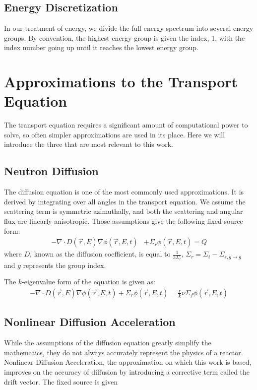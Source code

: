 \subsection{Energy Discretization}
In our treatment of energy, we divide the full energy spectrum into several energy groups. By convention, the highest energy group is given the index, 1, with the index number going up until it reaches the lowest energy group. 

\section{Approximations to the Transport Equation}
The transport equation requires a significant amount of computational power to solve, so often simpler approximations are used in its place. Here we will introduce the three that are most relevant to this work.

\subsection{Neutron Diffusion}
The diffusion equation is one of the most commonly used approximations. It is derived by integrating over all angles in the transport equation. We assume the scattering term is symmetric azimuthally, and both the scattering and angular flux are linearly anisotropic. Those assumptions give the following fixed source form:
\begin{equation}
\begin{split}
 - \nabla \cdot D(\vec{r}, E)\nabla\phi(\vec{r}, E, t) &+ \Sigma_r \phi(\vec{r}, E, t) = Q
\end{split}
\label{eq:diffusion_fixed_source}
\end{equation}
where $D$, known as the diffusion coefficient, is equal to $\frac{1}{3\Sigma_t}$, $\Sigma_r = \Sigma_t - \Sigma_{s, g \rightarrow g}$ and $g$ represents the group index. 

The $k$-eigenvalue form of the equation is given as:
\begin{equation}
    \begin{split}
         - \nabla \cdot D(\vec{r}, E)\nabla\phi(\vec{r}, E, t) + \Sigma_r \phi(\vec{r}, E, t) =  \frac{\chi}{k}\nu\Sigma_f\phi(\vec{r}, E, t) 
    \end{split}
    \label{eq:diffusion_eigenvalue}
\end{equation}

\subsection{Nonlinear Diffusion Acceleration}
While the assumptions of the diffusion equation greatly simplify the mathematics, they do not always accurately represent the physics of a reactor. Nonlinear Diffusion Acceleration, the approximation on which this work is based, improves on the accuracy of diffusion by introducing a corrective term called the drift vector. The fixed source is given 

